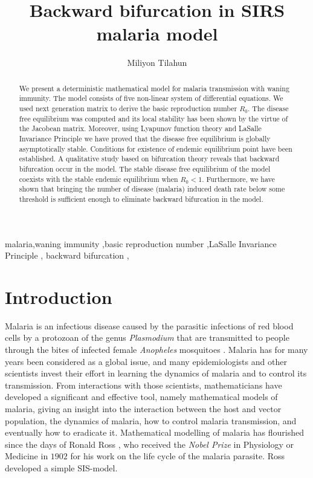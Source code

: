 \documentclass[review]{elsarticle}
\begin{document}
\begin{frontmatter}

\title{Backward bifurcation in SIRS malaria model}

\author[1]{Miliyon Tilahun}


\begin{abstract}
We present a deterministic mathematical model for malaria transmission with waning immunity. The model consists of five non-linear system of differential equations. We used next generation matrix to derive the basic reproduction number $R_0$. The disease free equilibrium was computed and its local stability has been shown by the virtue of the Jacobean matrix. Moreover, using Lyapunov function theory and LaSalle Invariance Principle we have proved that the disease free equilibrium is globally asymptotically stable. Conditions for existence of endemic equilibrium point have been established. A qualitative study based on bifurcation theory reveals that backward bifurcation occur in the model. The stable disease free equilibrium of the model coexists with the stable endemic equilibrium when $R_0<1$. Furthermore, we have shown that bringing the number of disease (malaria) induced death rate below some threshold is sufficient enough to eliminate backward bifurcation in the model.
\end{abstract}

\begin{keyword}
malaria\sep waning immunity \sep basic reproduction number \sep LaSalle Invariance Principle \sep
backward bifurcation \sep
\end{keyword}

\end{frontmatter}

\linenumbers

\section{Introduction}

Malaria is an infectious disease caused by the parasitic infections of red blood cells by a protozoan of the genus \textit{Plasmodium} that are transmitted to people through the bites of infected female \textit{Anopheles} mosquitoes \cite{who}.
Malaria has for many years been considered as a global issue, and many epidemiologists and other scientists invest their effort in learning the dynamics of malaria and to control its transmission. From interactions with those scientists, mathematicians have developed a significant and effective tool, namely mathematical models of malaria, giving an insight into the interaction between the host and vector population, the dynamics of malaria, how to control malaria transmission, and eventually how to eradicate it. Mathematical modelling of malaria has flourished since the days of Ronald Ross \cite{Ross11}, who received the \textit{Nobel Prize} in Physiology or Medicine in $1902$ for his work on the life cycle of the malaria parasite. Ross developed a simple SIS-model.
\end{document}
